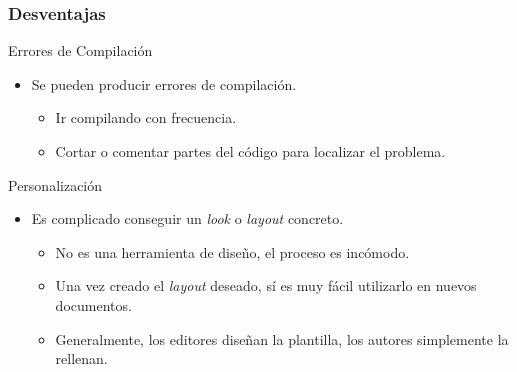 \documentclass[aspectratio=1610]{beamer}%
\begin{document}
\begin{frame}[fragile]
\frametitle{\textbf{Desventajas}}
\justifying
 \begin{block}{Errores de Compilación}
\begin{itemize}\justifying
  \item Se pueden producir errores de compilación.
  \begin{itemize}\justifying
  \item Ir compilando con frecuencia.
  \item Cortar o comentar partes del código para localizar el problema.
\end{itemize}

\end{itemize}

\end{block}

\begin{block}{Personalización}
\begin{itemize}\justifying
  \item Es complicado conseguir un \textit{look} o \textit{layout} concreto.
  \begin{itemize}\justifying
  \item No es una herramienta de diseño, el proceso es incómodo.
  \item Una vez creado el \textit{layout} deseado, sí es muy fácil utilizarlo en nuevos documentos.
  \item Generalmente, los editores diseñan la plantilla, los autores simplemente la rellenan.
\end{itemize}

\end{itemize}

\end{block}

\end{frame}
\end{document}

